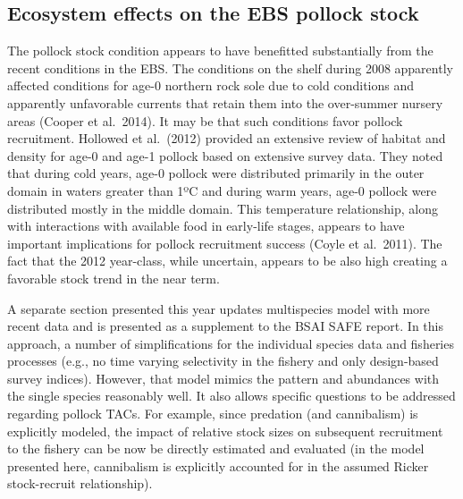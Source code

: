 \hypertarget{ecosystem-effects-on-the-ebs-pollock-stock}{%
\subsection{Ecosystem effects on the EBS pollock
stock}\label{ecosystem-effects-on-the-ebs-pollock-stock}}

The pollock stock condition appears to have benefitted substantially
from the recent conditions in the EBS. The conditions on the shelf
during 2008 apparently affected conditions for age-0 northern rock sole
due to cold conditions and apparently unfavorable currents that retain
them into the over-summer nursery areas (Cooper et al.~2014). It may be
that such conditions favor pollock recruitment. Hollowed et al.~(2012)
provided an extensive review of habitat and density for age-0 and age-1
pollock based on extensive survey data. They noted that during cold
years, age-0 pollock were distributed primarily in the outer domain in
waters greater than 1ºC and during warm years, age-0 pollock were
distributed mostly in the middle domain. This temperature relationship,
along with interactions with available food in early-life stages,
appears to have important implications for pollock recruitment success
(Coyle et al.~2011). The fact that the 2012 year-class, while uncertain,
appears to be also high creating a favorable stock trend in the near
term.

A separate section presented this year updates multispecies model with
more recent data and is presented as a supplement to the BSAI SAFE
report. In this approach, a number of simplifications for the individual
species data and fisheries processes (e.g., no time varying selectivity
in the fishery and only design-based survey indices). However, that
model mimics the pattern and abundances with the single species
reasonably well. It also allows specific questions to be addressed
regarding pollock TACs. For example, since predation (and cannibalism)
is explicitly modeled, the impact of relative stock sizes on subsequent
recruitment to the fishery can be now be directly estimated and
evaluated (in the model presented here, cannibalism is explicitly
accounted for in the assumed Ricker stock-recruit relationship).


